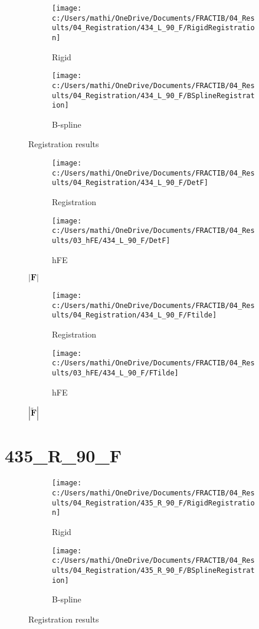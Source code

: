 \documentclass{article}%
\begin{document}
\begin{figure}[h!]%
\begin{subfigure}[b]{0.5\linewidth}%
\texttt{[image: c:/Users/mathi/OneDrive/Documents/FRACTIB/04\_Results/04\_Registration/434\_L\_90\_F/RigidRegistration]}%
\caption{Rigid}%
\end{subfigure}%
\begin{subfigure}[b]{0.5\linewidth}%
\texttt{[image: c:/Users/mathi/OneDrive/Documents/FRACTIB/04\_Results/04\_Registration/434\_L\_90\_F/BSplineRegistration]}%
\caption{B{-}spline}%
\end{subfigure}%
\caption{Registration results}%
\end{figure}

%


\begin{figure}[h!]%
\begin{subfigure}[b]{0.5\linewidth}%
\texttt{[image: c:/Users/mathi/OneDrive/Documents/FRACTIB/04\_Results/04\_Registration/434\_L\_90\_F/DetF]}%
\caption{Registration}%
\end{subfigure}%
\begin{subfigure}[b]{0.5\linewidth}%
\texttt{[image: c:/Users/mathi/OneDrive/Documents/FRACTIB/04\_Results/03\_hFE/434\_L\_90\_F/DetF]}%
\caption{hFE}%
\end{subfigure}%
\caption{$|\mathbf{F}|$}%
\end{figure}

%


\begin{figure}[h!]%
\begin{subfigure}[b]{0.5\linewidth}%
\texttt{[image: c:/Users/mathi/OneDrive/Documents/FRACTIB/04\_Results/04\_Registration/434\_L\_90\_F/Ftilde]}%
\caption{Registration}%
\end{subfigure}%
\begin{subfigure}[b]{0.5\linewidth}%
\texttt{[image: c:/Users/mathi/OneDrive/Documents/FRACTIB/04\_Results/03\_hFE/434\_L\_90\_F/FTilde]}%
\caption{hFE}%
\end{subfigure}%
\caption{$|\widetilde{\mathbf{F}}|$}%
\end{figure}

%
\newpage%
\section*{435\_R\_90\_F}%
\label{sec:435R90F}%


\begin{figure}[h!]%
\begin{subfigure}[b]{0.5\linewidth}%
\texttt{[image: c:/Users/mathi/OneDrive/Documents/FRACTIB/04\_Results/04\_Registration/435\_R\_90\_F/RigidRegistration]}%
\caption{Rigid}%
\end{subfigure}%
\begin{subfigure}[b]{0.5\linewidth}%
\texttt{[image: c:/Users/mathi/OneDrive/Documents/FRACTIB/04\_Results/04\_Registration/435\_R\_90\_F/BSplineRegistration]}%
\caption{B{-}spline}%
\end{subfigure}%
\caption{Registration results}%
\end{figure}
\end{document}
